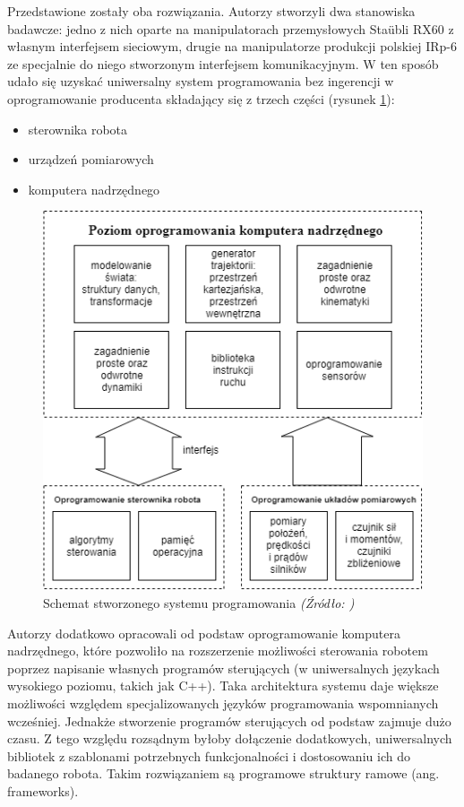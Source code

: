 \documentclass[a4paper, 12pt, twoside]{article}
\begin{document}
Przedstawione zostały oba rozwiązania. Autorzy stworzyli dwa stanowiska badawcze: jedno z nich oparte na manipulatorach przemysłowych Sta{\"u}bli RX60 z własnym interfejsem sieciowym, drugie na manipulatorze produkcji polskiej IRp-6 ze specjalnie do niego stworzonym interfejsem komunikacyjnym. W ten sposób udało się uzyskać uniwersalny system programowania bez ingerencji w oprogramowanie producenta składający się z trzech części (rysunek \ref{fig:system_scheme}):

\begin{itemize}
\item sterownika robota
\item urządzeń pomiarowych
\item komputera nadrzędnego
\end{itemize}

\begin{figure}[hbt!]
\centering
\includegraphics[width=0.8\linewidth]{images/system_scheme.png}
\caption{Schemat stworzonego systemu programowania\textit{ (Źródło: \cite{systemkozlowski}) } }
\label{fig:system_scheme}
\end{figure}

Autorzy dodatkowo opracowali od podstaw oprogramowanie komputera nadrzędnego, które pozwoliło na rozszerzenie możliwości sterowania robotem poprzez napisanie własnych programów sterujących (w uniwersalnych językach wysokiego poziomu, takich jak C++). Taka architektura systemu daje większe możliwości względem specjalizowanych języków programowania wspomnianych wcześniej. Jednakże stworzenie programów sterujących od podstaw zajmuje dużo czasu. Z tego względu rozsądnym byłoby dołączenie dodatkowych, uniwersalnych bibliotek z szablonami potrzebnych funkcjonalności i dostosowaniu ich do badanego robota. Takim rozwiązaniem są programowe struktury ramowe (ang. frameworks).
\end{document}
